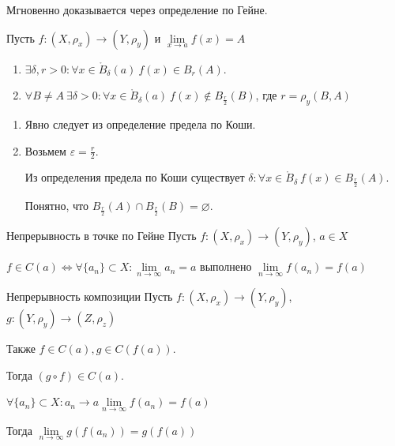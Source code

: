 Мгновенно доказывается через определение по Гейне.

\begin{thrm}{}{}
    Пусть \( f : (X, \rho_x) \to (Y, \rho_y) \) и \( \lim\limits_{x \to a} f(x) = A \)

    \begin{enumerate}
        \item
            \( \exists \delta, r > 0 : \forall x \in \mathring{B}_\delta(a) \: f(x) \in B_r(A) \).
        \item
            \( \forall B \neq A \: \exists \delta > 0 : \forall x \in \mathring{B}_\delta(a) \: f(x) \notin B_{\frac{r}{2}}(B) \),
            где \( r = \rho_y(B, A) \)
    \end{enumerate}
\end{thrm}

\begin{enumerate}
    \item
        Явно следует из определение предела по Коши.
    \item
        Возьмем \( \varepsilon = \frac{r}{2} \).

        Из определения предела по Коши существует \( \delta : \forall x \in \mathring{B}_{\delta} \ f(x) \in B_{\frac{r}{2}} (A) \).

        Понятно, что \( B_{\frac{r}{2}} (A) \cap B_{\frac{r}{2}} (B) = \varnothing \).
\end{enumerate}

\begin{defn}{Непрерывность в точке по Гейне}{}
    Пусть \( f : (X, \rho_x) \to (Y, \rho_y) \), \( a \in X \)

    \( f \in C(a) \Leftrightarrow \forall \{ a_n \} \subset X : \lim\limits_{n \to \infty} a_n = a \)
    выполнено \( \lim\limits_{n \to \infty} f(a_n) = f(a) \)
\end{defn}

\begin{defn}{Непрерывность композиции}{}
    Пусть \( f : (X, \rho_x) \to (Y, \rho_y) \), \( g : (Y, \rho_y) \to (Z, \rho_z) \)

    Также \( f \in C(a), g \in C(f(a)) \).

    Тогда \( (g \circ f) \in C(a) \).
\end{defn}

\( \forall \{ a_n \} \subset X : a_n \to a \lim\limits_{n \to \infty} f(a_n) = f(a) \)

Тогда \( \lim\limits_{n \to \infty} g(f(a_n)) = g(f(a)) \)

